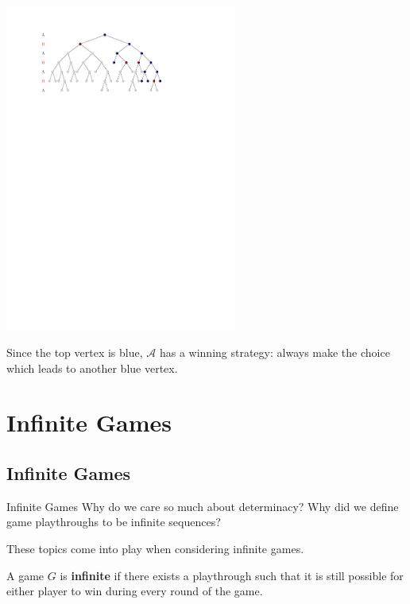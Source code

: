 \documentclass{beamer}
\theoremstyle{theorem}
\theoremstyle{definition}
\newcommand{\<}{\langle}
\renewcommand{\>}{\rangle}
\newcommand{\pl}[1]{\mathscr{#1}}
\newcommand{\vpause}{\pause\vspace{1em}}
\newcommand{\term}[1]{\textbf{#1}}
\begin{document}
\begin{frame}
  \centerline{\includegraphics[width=3in]{decisionTree5.pdf}}

  \vspace{1em}

  Since the top vertex is blue, $\pl A$ has a winning strategy: always make
  the choice which leads to another blue vertex.
\end{frame}

\section{Infinite Games}

\subsection{Infinite Games}

\begin{frame}{Infinite Games}
  Why do we care so much about determinacy? Why did we define game playthroughs
  to be infinite sequences?

  \vpause

  These topics come into play when considering infinite games.

  \vpause

  \begin{definition}
    A game $G$ is \term{infinite} if there exists a playthrough such that it
    is still possible for either player to win during every round of the game.
  \end{definition}
\end{frame}
\end{document}
